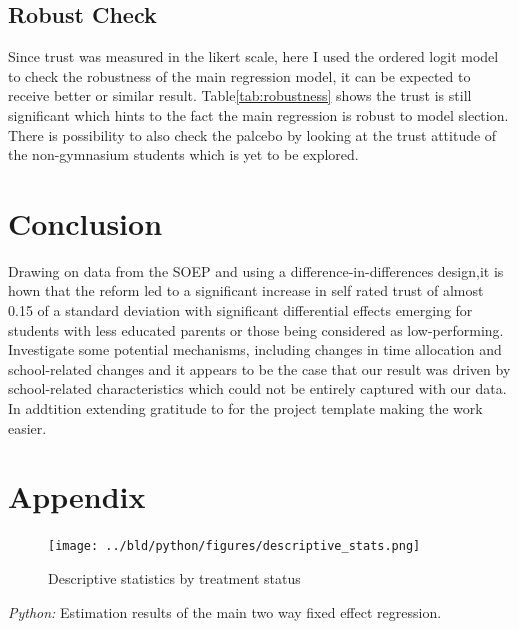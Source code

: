 \documentclass[11pt, a4paper, leqno]{article}
\begin{document}
\subsection{Robust Check}
Since trust was measured in the likert scale, here I used the ordered logit model to check the robustness of the main regression model, it can be expected to receive better or similar result.
Table\ref{tab:robustness} shows the trust is still significant which hints to the fact the main regression is robust to model slection. There is possibility to also check the palcebo by 
looking at the trust attitude of the non-gymnasium students which is yet to be explored.  

\section{Conclusion\label{sec:conclusion}}
Drawing on data from the SOEP and using a difference-in-differences design,it is hown that the reform led to a
significant increase in self rated trust of almost 0.15 of a standard deviation with significant differential
effects emerging for students with less educated parents or those being considered as low-performing.
Investigate some potential mechanisms, including changes in time allocation and school-related
changes and it appears to be the case that our result was driven by school-related characteristics which
could not be entirely captured with our data. In addtition extending gratitude to\citep{GaudeckerEconProjectTemplates}
for the project template making the work easier. 









\printbibliography
{}



\section{Appendix\label{sec:appendix}}

\begin{figure}[H]
    \centering
    \texttt{[image: ../bld/python/figures/descriptive\_stats.png]}
     \caption{Descriptive statistics by treatment status}\label{fig:descriptive_stats}
\end{figure}

\begin{table}[H]
    
    \caption{\label{tab:main_reg}\emph{Python:} Estimation results of the
        main two way fixed effect regression.}
\end{table}
\end{document}
